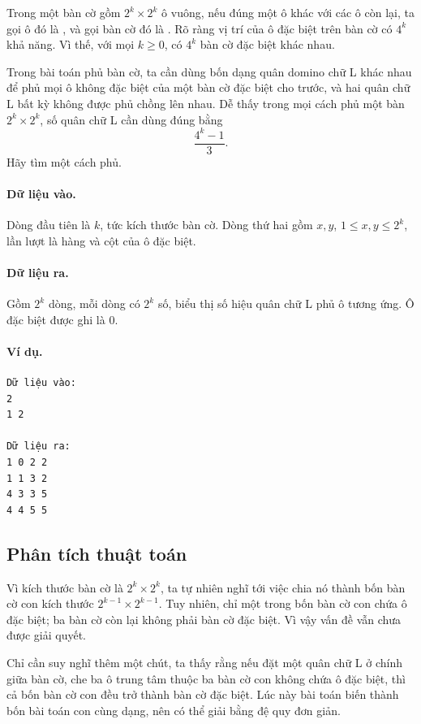 \documentclass[11pt]{article}
\begin{document}
Trong một bàn cờ gồm \(2^k\times 2^k\) ô vuông, nếu đúng một ô khác với các ô
còn lại, ta gọi ô đó là , và gọi bàn cờ đó là . Rõ ràng vị trí của ô đặc biệt trên bàn cờ có \(4^k\) khả năng. Vì
thế, với mọi \(k\ge 0\), có \(4^k\) bàn cờ đặc biệt khác nhau.

Trong bài toán phủ bàn cờ, ta cần dùng bốn dạng quân domino chữ L khác nhau để
phủ mọi ô không đặc biệt của một bàn cờ đặc biệt cho trước, và hai quân chữ L
bất kỳ không được phủ chồng lên nhau. Dễ thấy trong mọi cách phủ một bàn
\(2^k\times 2^k\), số quân chữ L cần dùng đúng bằng
\[
  \frac{4^k-1}{3}.
\]
Hãy tìm một cách phủ.

\paragraph{Dữ liệu vào.}
Dòng đầu tiên là \(k\), tức kích thước bàn cờ. Dòng thứ hai gồm \(x,y\),
\(1\le x,y\le 2^k\), lần lượt là hàng và cột của ô đặc biệt.

\paragraph{Dữ liệu ra.}
Gồm \(2^k\) dòng, mỗi dòng có \(2^k\) số, biểu thị số hiệu quân chữ L phủ ô
tương ứng. Ô đặc biệt được ghi là \(0\).

\paragraph{Ví dụ.}
\begin{verbatim}
Dữ liệu vào:
2
1 2

Dữ liệu ra:
1 0 2 2
1 1 3 2
4 3 3 5
4 4 5 5
\end{verbatim}

\subsection{Phân tích thuật toán}

Vì kích thước bàn cờ là \(2^k\times 2^k\), ta tự nhiên nghĩ tới việc chia nó
thành bốn bàn cờ con kích thước \(2^{k-1}\times 2^{k-1}\). Tuy nhiên, chỉ một
trong bốn bàn cờ con chứa ô đặc biệt; ba bàn cờ còn lại không phải bàn cờ đặc
biệt. Vì vậy vấn đề vẫn chưa được giải quyết.

Chỉ cần suy nghĩ thêm một chút, ta thấy rằng nếu đặt một quân chữ L ở chính
giữa bàn cờ, che ba ô trung tâm thuộc ba bàn cờ con không chứa ô đặc biệt, thì
cả bốn bàn cờ con đều trở thành bàn cờ đặc biệt. Lúc này bài toán biến thành
bốn bài toán con cùng dạng, nên có thể giải bằng đệ quy đơn giản.
\end{document}
